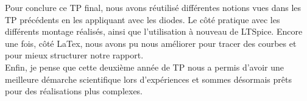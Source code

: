 Pour conclure ce TP final, nous avons réutilisé différentes notions vues dans les TP précédents en les appliquant avec les diodes. Le côté pratique avec les différents montage réalisés, ainsi que l’utilisation à nouveau de LTSpice. Encore une fois, côté LaTex, nous avons pu nous améliorer pour tracer des courbes et pour mieux structurer notre rapport.
\\
Enfin, je pense que cette deuxième année de TP nous a permis d'avoir une meilleure démarche scientifique lors d'expériences et sommes désormais prêts pour des réalisations plus complexes.